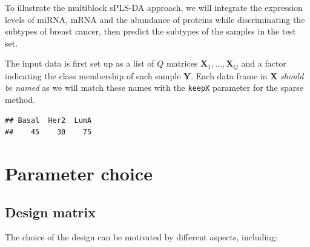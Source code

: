 \documentclass[]{book}
\newenvironment{Shaded}{\begin{snugshade}}{\end{snugshade}}
\newcommand{\CommentTok}[1]{\textcolor[rgb]{0.56,0.35,0.01}{\textit{#1}}}
\newcommand{\DataTypeTok}[1]{\textcolor[rgb]{0.13,0.29,0.53}{#1}}
\newcommand{\KeywordTok}[1]{\textcolor[rgb]{0.13,0.29,0.53}{\textbf{#1}}}
\newcommand{\NormalTok}[1]{#1}
\newcommand{\OperatorTok}[1]{\textcolor[rgb]{0.81,0.36,0.00}{\textbf{#1}}}
\newcommand{\StringTok}[1]{\textcolor[rgb]{0.31,0.60,0.02}{#1}}
\begin{document}
To illustrate the multiblock sPLS-DA approach, we will integrate the expression levels of miRNA, mRNA and the abundance of proteins while discriminating the subtypes of breast cancer, then predict the subtypes of the samples in the test set.

The input data is first set up as a list of \(Q\) matrices \(\boldsymbol X_1, \dots, \boldsymbol X_Q\) and a factor indicating the class membership of each sample \(\boldsymbol Y\). Each data frame in \(\boldsymbol X\) \emph{should be named} as we will match these names with the \texttt{keepX} parameter for the sparse method.

\begin{Shaded}
\end{Shaded}

\begin{verbatim}
## Basal  Her2  LumA 
##    45    30    75
\end{verbatim}

\hypertarget{parameter-choice}{%
\section{Parameter choice}\label{parameter-choice}}

\hypertarget{diablo:design}{%
\subsection{Design matrix}\label{diablo:design}}

The choice of the design can be motivated by different aspects, including:
\end{document}
